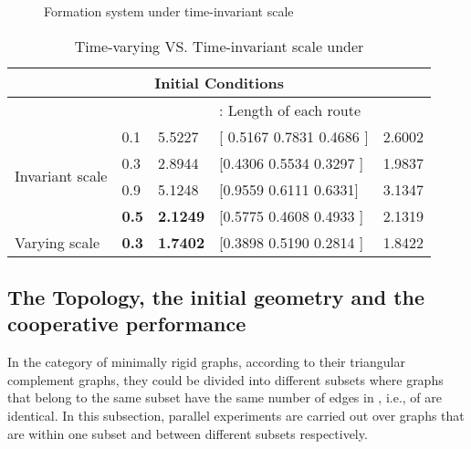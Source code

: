 \documentclass[times]{rncauth}
\begin{document}
\begin{figure}
\caption{Formation system under time-invariant
scale}\label{fig:time_invariant}
\end{figure}
\begin{table}
  \caption{Time-varying VS. Time-invariant scale under }\label{table:invar}
  \begin{center}
\newsavebox{\tablebox}
\begin{lrbox}{\tablebox}
\begin{tabular}{|l|l|l|l|l|}
\hline
\multicolumn{5}{|c|}{Initial Conditions   } \\
\hline
 &  &   &  : Length of each route & \\
\hline
\multirow{4}{*}{Invariant scale} &0.1 &5.5227 & [ 0.5167    0.7831    0.4686    ]&  2.6002\\
 &0.3 & 2.8944 & [0.4306  0.5534  0.3297  ] &   1.9837\\
 &0.9 & 5.1248 &[0.9559    0.6111        0.6331]& 3.1347\\
 &\textbf{\textbf{0.5 }} &  \textbf{2.1249 } &[0.5775  0.4608  0.4933  ] &2.1319\\
 \hline
Varying scale
 &\textbf{0.3}&\textbf{1.7402} & [0.3898 0.5190 0.2814 ] & 1.8422\\
\hline
\end{tabular}
\end{lrbox}
\scalebox{0.7}{\usebox{\tablebox}}
\end{center}
\end{table}





\subsection{The Topology, the initial geometry and the cooperative performance}
In the category of minimally rigid graphs, according to their
triangular complement graphs, they could be divided into different
subsets where graphs  that belong to the same subset have the
same number of edges in , i.e.,  of  are identical.
In this subsection, parallel experiments are carried out over graphs
that are within one subset and between different subsets
respectively.
\end{document}
